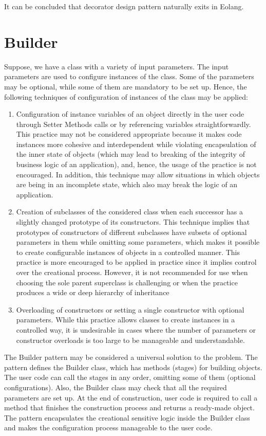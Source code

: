 \documentclass[12pt]{book}
\begin{document}
It can be concluded that decorator design pattern naturally exits in Eolang.

\section{Builder}
Suppose, we have a class with a variety of input parameters. The input parameters are used to configure instances of the class. Some of the parameters may be optional, while some of them are mandatory to be set up. Hence, the following techniques of configuration of instances of the class may be applied:
\begin{enumerate}
    \item Configuration of instance variables of an object directly in the user code through Setter Methods calls or by referencing variables straightforwardly. This practice may not be considered appropriate because it makes code instances more cohesive and interdependent while violating encapsulation of the inner state of objects (which may lead to breaking of the integrity of business logic of an application), and, hence, the usage of the practice is not encouraged. In addition, this technique may allow situations in which objects are being in an incomplete state, which also may break the logic of an application.
    \item Creation of subclasses of the considered class when each successor has a slightly changed prototype of its constructors. This technique implies that prototypes of constructors of different subclasses have subsets of optional parameters in them while omitting some parameters, which makes it possible to create configurable instances of objects in a controlled manner. This practice is more encouraged to be applied in practice since it implies control over the creational process. However, it is not recommended for use when choosing the sole parent superclass is challenging or when the practice produces a wide or deep hierarchy of inheritance
    \item Overloading of constructors or setting a single constructor with optional parameters. While this practice allows classes to create instances in a controlled way, it is undesirable in cases where the number of parameters or constructor overloads is too large to be manageable and understandable.
\end{enumerate}

The Builder pattern may be considered a universal solution to the problem. The pattern defines the Builder class, which has methods (stages) for building objects. The user code can call the stages in any order, omitting some of them (optional configurations). Also, the Builder class may check that all the required parameters are set up. At the end of construction, user code is required to call a method that finishes the construction process and returns a ready-made object. The pattern encapsulates the creational sensitive logic inside the Builder class and makes the configuration process manageable to the user code.
\end{document}
